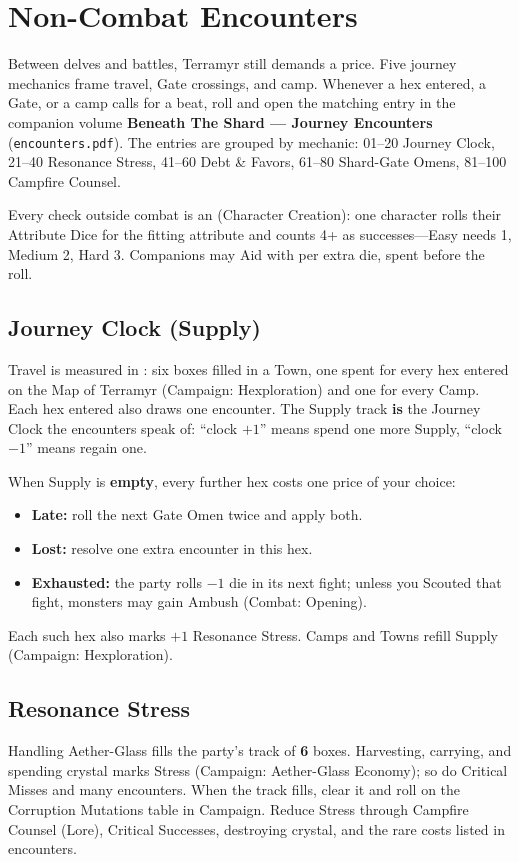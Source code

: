 \section{Non-Combat Encounters}

Between delves and battles, Terramyr still demands a price. Five journey mechanics frame travel, Gate crossings, and camp.
Whenever a hex entered, a Gate, or a camp calls for a beat, roll \dper{} and open the matching entry in the companion volume \textbf{Beneath The Shard --- Journey Encounters} (\texttt{encounters.pdf}). The entries are grouped by mechanic: 01--20 Journey Clock, 21--40 Resonance Stress, 41--60 Debt \& Favors, 61--80 Shard-Gate Omens, 81--100 Campfire Counsel.

Every check outside combat is an  (Character Creation): one character rolls their Attribute Dice for the fitting attribute and counts 4+ as successes---Easy needs 1, Medium 2, Hard 3. Companions may Aid with  per extra die, spent before the roll.

\subsection{Journey Clock (Supply)}
Travel is measured in : six boxes filled in a Town, one spent for every hex entered on the Map of Terramyr (Campaign: Hexploration) and one for every Camp. Each hex entered also draws one encounter. The Supply track \textbf{is} the Journey Clock the encounters speak of: ``clock $+1$'' means spend one more Supply, ``clock $-1$'' means regain one.

When Supply is \textbf{empty}, every further hex costs one price of your choice:

\begin{itemize}
    \item \textbf{Late:} roll the next Gate Omen twice and apply both.
    \item \textbf{Lost:} resolve one extra encounter in this hex.
    \item \textbf{Exhausted:} the party rolls $-1$ die in its next fight; unless you Scouted that fight, monsters may gain Ambush (Combat: Opening).
\end{itemize}

Each such hex also marks $+1$ Resonance Stress. Camps and Towns refill Supply (Campaign: Hexploration).

\subsection{Resonance Stress}
Handling Aether-Glass fills the party's  track of \textbf{6} boxes. Harvesting, carrying, and spending crystal marks Stress (Campaign: Aether-Glass Economy); so do Critical Misses and many encounters.
When the track fills, clear it and roll on the Corruption Mutations table in Campaign.
Reduce Stress through Campfire Counsel (Lore), Critical Successes, destroying crystal, and the rare costs listed in encounters.

